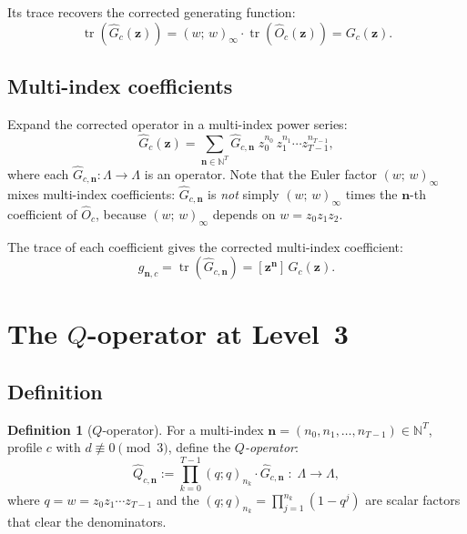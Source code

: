 \documentclass[11pt]{article}
\newcommand{\N}{\mathbb{N}}
\newcommand{\La}{\Lambda}
\newcommand{\qpochn}[3]{(#1;#2)_{#3}}
\DeclareMathOperator{\tr}{tr}
\theoremstyle{plain}
\theoremstyle{definition}
\newtheorem{definition}[theorem]{Definition}
\begin{document}
Its trace recovers the corrected generating function:
\[
  \tr(\hat{G}_c(\mathbf{z}))
  = (w;\,w)_\infty \cdot \tr(\hat{O}_c(\mathbf{z}))
  = G_c(\mathbf{z}).
\]

\subsection{Multi-index coefficients}

Expand the corrected operator in a multi-index power series:
\begin{equation}\label{eq:G-hat-expand}
  \hat{G}_c(\mathbf{z})
  = \sum_{\mathbf{n} \in \N^T}
    \hat{G}_{c,\mathbf{n}}\;
    z_0^{n_0}\, z_1^{n_1} \cdots z_{T-1}^{n_{T-1}},
\end{equation}
where each $\hat{G}_{c,\mathbf{n}} \colon \La \to \La$ is an
operator.  Note that the Euler factor $(w;\,w)_\infty$ mixes
multi-index coefficients: $\hat{G}_{c,\mathbf{n}}$ is \emph{not}
simply $(w;\,w)_\infty$ times the $\mathbf{n}$-th coefficient
of $\hat{O}_c$, because $(w;\,w)_\infty$ depends on
$w = z_0 z_1 z_2$.

The trace of each coefficient gives the corrected multi-index
coefficient:
\begin{equation}\label{eq:gn-multi}
  g_{\mathbf{n},c}
  = \tr(\hat{G}_{c,\mathbf{n}})
  = [\mathbf{z}^\mathbf{n}]\, G_c(\mathbf{z}).
\end{equation}


\section{The $Q$-operator at Level~3}
\label{sec:Q-operator-L3}

\subsection{Definition}

\begin{definition}[$Q$-operator]
\label{def:Q-hat}
For a multi-index $\mathbf{n} = (n_0, n_1, \ldots, n_{T-1})
\in \N^T$, profile $c$ with $d \not\equiv 0 \pmod{3}$, define the
\emph{$Q$-operator}:
\begin{equation}\label{eq:Q-hat}
  \hat{Q}_{c,\mathbf{n}}
  := \prod_{k=0}^{T-1} \qpochn{q}{q}{n_k}
     \cdot \hat{G}_{c,\mathbf{n}}
  \;\colon\; \La \to \La,
\end{equation}
where $q = w = z_0 z_1 \cdots z_{T-1}$ and the
$\qpochn{q}{q}{n_k} = \prod_{j=1}^{n_k}(1-q^j)$ are scalar
factors that clear the denominators.
\end{definition}
\end{document}
